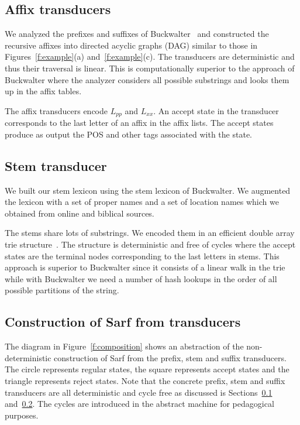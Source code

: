 \documentclass[11pt]{article}
\begin{document}

\subsection{Affix transducers}
\label{sec:affixFSA}

We analyzed the prefixes and suffixes of 
Buckwalter~
and constructed the recursive affixes
into directed acyclic graphs (DAG) similar to 
those in Figures~\ref{f:example}(a) and~\ref{f:example}(c).
The transducers are deterministic and thus 
their traversal is linear.
This is computationally superior to the 
approach of Buckwalter where the analyzer considers
all possible substrings %
and looks them up in the affix tables. 

The affix transducers encode $L_{pp}$ and
$L_{xx}$.
An accept state in the transducer corresponds to the last letter 
of an affix in the affix lists.
The accept states produce as output the POS and other tags
associated with the state.

\subsection{Stem transducer}
\label{sec:stemFSA}

We built our stem lexicon using the stem lexicon of 
Buckwalter. 
We augmented the lexicon with a set of proper names and
a set of location names which we 
obtained from online and biblical sources. 

The stems share lots of substrings. We encoded them in
an efficient double array trie structure~\cite{Aoe:89}. 
The structure is deterministic and free of cycles where the 
accept states are the terminal nodes corresponding to the last 
letters in stems. 
This approach is superior to Buckwalter since it consists of
a linear walk in the trie while with Buckwalter we need
a number of hash lookups in the order of all possible partitions
of the string.

\subsection{Construction of Sarf from transducers}
\label{sec:ndfsa}

The diagram in Figure~\ref{f:composition} shows an 
abstraction of the non-deterministic construction of Sarf
from the prefix, stem and suffix transducers. 
The circle represents regular states, the square
represents accept states and the triangle represents
reject states. 
Note that the concrete prefix, stem and suffix transducers
are all deterministic and cycle free as discussed 
is Sections~\ref{sec:affixFSA} and~\ref{sec:stemFSA}.
The cycles are introduced in the abstract machine
for pedagogical purposes.
\end{document}
